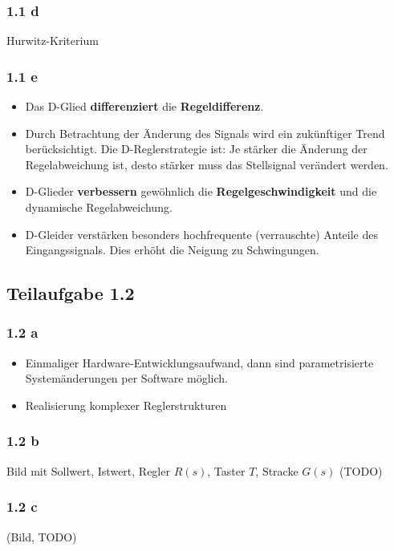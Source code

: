 \documentclass[a4paper]{scrartcl}
\begin{document}
  \subsubsection*{1.1 d}
  Hurwitz-Kriterium

  \subsubsection*{1.1 e}
  \begin{itemize}
      \item Das D-Glied \textbf{differenziert} die \textbf{Regeldifferenz}.
      \item Durch Betrachtung der Änderung des Signals wird ein zukünftiger
            Trend berücksichtigt. Die D-Reglerstrategie ist: Je stärker
            die Änderung der Regelabweichung ist, desto stärker muss das
            Stellsignal verändert werden.
      \item D-Glieder \textbf{verbessern} gewöhnlich die
            \textbf{Regelgeschwindigkeit} und die dynamische Regelabweichung.
      \item D-Gleider verstärken besonders hochfrequente (verrauschte)
            Anteile des Eingangssignals. Dies erhöht die Neigung zu
            Schwingungen.
  \end{itemize}


  \subsection*{Teilaufgabe 1.2}
  \subsubsection*{1.2 a}
  \begin{itemize}
      \item Einmaliger Hardware-Entwicklungsaufwand, dann sind parametrisierte
            Systemänderungen per Software möglich.
      \item Realisierung komplexer Reglerstrukturen
  \end{itemize}

  \subsubsection*{1.2 b}
  Bild mit Sollwert, Istwert, Regler $R(s)$, Taster $T$, Stracke $G(s)$
  (TODO)

  \subsubsection*{1.2 c}
  (Bild, TODO)
\end{document}
